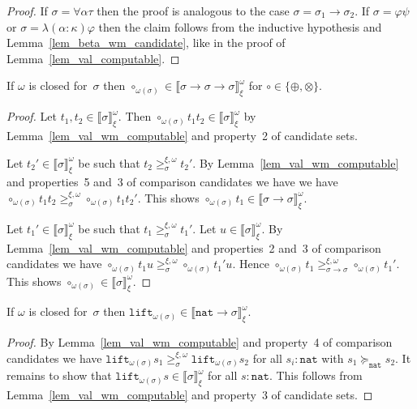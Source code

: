 \documentclass[runningheads,a4paper]{llncs}
\newcommand{\arrtype}{\rightarrow}
\newcommand{\nat}{\mathtt{nat}}
\newcommand{\lift}{\mathtt{lift}}
\newcommand{\val}[3]{\ensuremath{\llbracket#1\rrbracket_{#2}^{#3}}}
\newcommand{\gteq}[3]{\ensuremath{\ge_{#1}^{#2,#3}}}
\begin{document}
\begin{proof}
  If $\sigma=\forall\alpha\tau$ then the proof is analogous to the
  case $\sigma=\sigma_1\arrtype\sigma_2$. If $\sigma=\varphi\psi$ or
  $\sigma=\lambda(\alpha:\kappa)\varphi$ then the claim follows from
  the inductive hypothesis and Lemma~\ref{lem_beta_wm_candidate}, like
  in the proof of Lemma~\ref{lem_val_computable}.
\end{proof}

\begin{lemma}\label{lem_wm_circ}
  If $\omega$ is closed for~$\sigma$ then $\circ_{\omega(\sigma)} \in
  \val{\sigma \arrtype \sigma \arrtype \sigma}{\xi}{\omega}$ for
  $\circ \in \{ \oplus, \otimes \}$.
\end{lemma}

\begin{proof}
  Let $t_1,t_2 \in \val{\sigma}{\xi}{\omega}$. Then
  $\circ_{\omega(\sigma)} t_1 t_2 \in \val{\sigma}{\xi}{\omega}$ by
  Lemma~\ref{lem_val_wm_computable} and property~2 of candidate
  sets.

  Let $t_2' \in \val{\sigma}{\xi}{\omega}$ be such that $t_2
  \gteq{\sigma}{\xi}{\omega} t_2'$. By
  Lemma~\ref{lem_val_wm_computable} and properties~5 and~3 of
  comparison candidates we have we have $\circ_{\omega(\sigma)} t_1
  t_2 \gteq{\sigma}{\xi}{\omega} \circ_{\omega(\sigma)} t_1
  t_2'$. This shows $\circ_{\omega(\sigma)} t_1 \in
  \val{\sigma\arrtype\sigma}{\xi}{\omega}$.

  Let $t_1' \in \val{\sigma}{\xi}{\omega}$ be such that $t_1
  \gteq{\sigma}{\xi}{\omega} t_1'$. Let $u \in
  \val{\sigma}{\xi}{\omega}$. By Lemma~\ref{lem_val_wm_computable} and
  properties~2 and~3 of comparison candidates we have
  $\circ_{\omega(\sigma)} t_1 u \gteq{\sigma}{\xi}{\omega}
  \circ_{\omega(\sigma)} t_1' u$. Hence $\circ_{\omega(\sigma)} t_1
  \gteq{\sigma\arrtype\sigma}{\xi}{\omega} \circ_{\omega(\sigma)}
  t_1'$. This shows $\circ_{\omega(\sigma)} \in
  \val{\sigma}{\xi}{\omega}$.
\end{proof}

\begin{lemma}\label{lem_wm_lift}
  If $\omega$ is closed for~$\sigma$ then $\lift_{\omega(\sigma)} \in
  \val{\nat\arrtype\sigma}{\xi}{\omega}$.
\end{lemma}

\begin{proof}
  By Lemma~\ref{lem_val_wm_computable} and property~4 of comparison
  candidates we have $\lift_{\omega(\sigma)}s_1
  \gteq{\sigma}{\xi}{\omega} \lift_{\omega(\sigma)}s_2$ for all $s_i :
  \nat$ with $s_1 \succeq_\nat s_2$. It remains to show that
  $\lift_{\omega(\sigma)}s \in \val{\sigma}{\xi}{\omega}$ for all $s :
  \nat$. This follows from Lemma~\ref{lem_val_wm_computable} and
  property~3 of candidate sets.
\end{proof}
\end{document}
